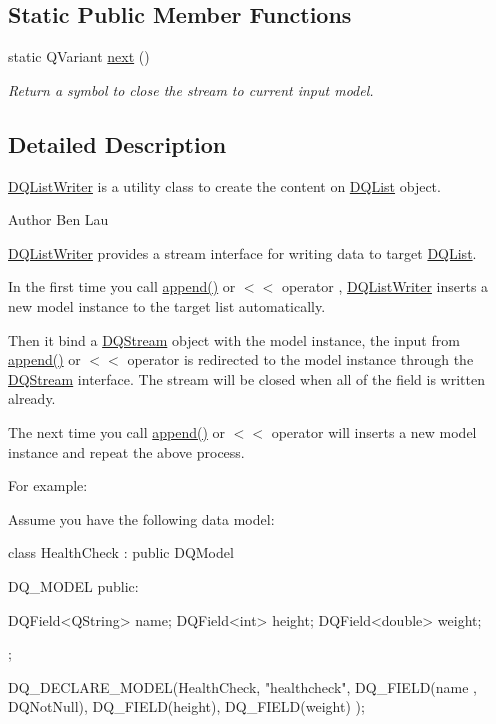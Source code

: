 \subsection*{Static Public Member Functions}
\begin{DoxyCompactItemize}
\item 
static QVariant \hyperlink{classDQListWriter_a5fbce83cb77c2ce6eaea54e39594d244}{next} ()
\begin{DoxyCompactList}\small\item\em Return a symbol to close the stream to current input model. \item\end{DoxyCompactList}\end{DoxyCompactItemize}


\subsection{Detailed Description}
\hyperlink{classDQListWriter}{DQListWriter} is a utility class to create the content on \hyperlink{classDQList}{DQList} object. \begin{DoxyAuthor}{Author}
Ben Lau
\end{DoxyAuthor}
\hyperlink{classDQListWriter}{DQListWriter} provides a stream interface for writing data to target \hyperlink{classDQList}{DQList}.

In the first time you call \hyperlink{classDQListWriter_a0760f9b9ca173fc4516ec91c12031b2c}{append()} or $<$$<$ operator , \hyperlink{classDQListWriter}{DQListWriter} inserts a new model instance to the target list automatically.

Then it bind a \hyperlink{classDQStream}{DQStream} object with the model instance, the input from \hyperlink{classDQListWriter_a0760f9b9ca173fc4516ec91c12031b2c}{append()} or $<$$<$ operator is redirected to the model instance through the \hyperlink{classDQStream}{DQStream} interface. The stream will be closed when all of the field is written already.

The next time you call \hyperlink{classDQListWriter_a0760f9b9ca173fc4516ec91c12031b2c}{append()} or $<$$<$ operator will inserts a new model instance and repeat the above process.

For example:

Assume you have the following data model:


\begin{DoxyCode}

class HealthCheck : public DQModel {
    DQ_MODEL
public:

    DQField<QString> name;
    DQField<int>     height;
    DQField<double>  weight;
};

DQ_DECLARE_MODEL(HealthCheck,
                 "healthcheck",
                 DQ_FIELD(name , DQNotNull),
                 DQ_FIELD(height),
                 DQ_FIELD(weight)
                 );
\end{DoxyCode}


